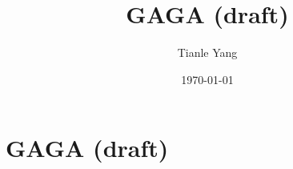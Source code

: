 \documentclass{noteformyself}
\title{GAGA (draft)}
\author{Tianle Yang}
\date{\today}
\begin{document}
    \maketitle

    \section{GAGA (draft)}



\end{document}
